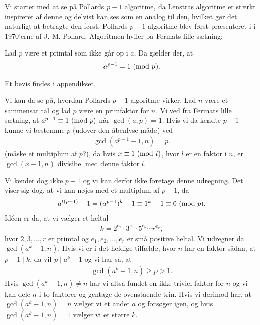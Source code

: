 Vi starter med at se på Pollards $p-1$ algoritme, da Lenstras algoritme er stærkt inspireret af denne og delvist kan ses som en analog til den, hvilket gør det naturligt at betragte den først. Pollards $p-1$ algoritme blev først præsenteret i \cite{Pollard} i 1970'erne af J. M. Pollard. Algoritmen hviler på Fermats lille sætning:

\begin{theorem}
\label{fermats_small_theorem}
Lad $p$ være et primtal som ikke går op i $a$. Da gælder der, at
\begin{align*}
	a^{p-1} = 1 \ (\mathrm{mod} \ p).
\end{align*}
\end{theorem}

\noindent Et bevis findes i appendikset.

Vi kan da se på, hvordan Pollards $p-1$ algoritme virker. Lad $n$ være et sammensat tal og lad $p$ være en primfaktor for $n$. Vi ved fra Fermats lille sætning, at $a^{p-1} \equiv 1 \ (\mathrm{mod} \ p)$ når $\gcd(a, p) = 1$. Hvis vi da kendte $p-1$ kunne vi bestemme $p$ (udover den åbenlyse måde) ved
\begin{align*}
	\gcd(a^{p-1} - 1, n) = p. 
\end{align*}
(måske et multiplum af $p$?), da hvis $x \equiv 1 \ (\mathrm{mod} \ l)$, hvor $l$ er en faktor i $n$, er $\gcd(x-1, n)$ divisibel med denne faktor $l$.

Vi kender dog ikke $p-1$ og vi kan derfor ikke foretage denne udregning. Det viser sig dog, at vi kan nøjes med et multiplum af $p-1$, da
\begin{align*}
	a^{t(p-1)} - 1 = (a^{p-1})^k - 1 \equiv 1^k - 1 \equiv 0 \ (\mathrm{mod} \ p).
\end{align*}
Idéen er da, at vi vælger et heltal
\begin{align*}
	k = 2^{e_2} \cdot 3^{e_3} \cdot 5^{e_5} \cdots r^{e_r},
\end{align*}
hvor $2, 3, \ldots, r$ er primtal og $e_1, e_2, \ldots, e_r$ er små positive heltal. Vi udregner da $\gcd(a^k - 1, n)$. Hvis vi er i det heldige tilfælde, hvor $n$ har en faktor sådan, at $p-1 \mid k$, da vil $p \mid a^k - 1$ og
vi har så, at
\begin{align*}
	\gcd(a^k - 1, n) \geq p > 1.
\end{align*}
Hvis $\gcd(a^k - 1, n) \neq n$ har vi altså fundet en ikke-triviel faktor for $n$ og vi kan dele $n$ i to faktorer og gentage de ovenstående trin. Hvis vi derimod har, at $\gcd(a^k -1, n) = n$ vælger vi et andet $a$ og forsøger igen, og hvis $\gcd(a^k-1,n)=1$ vælger vi et større $k$.

